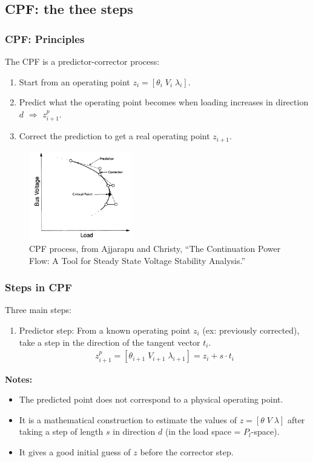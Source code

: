 \documentclass{beamer}
\begin{document}
\subsection{CPF: the thee steps}

\begin{frame}
  \frametitle{CPF: Principles}
The CPF is a predictor-corrector process:
\begin{enumerate}
\item Start from an operating point $z_i = [\theta_i \; V_i \; \lambda_i]$.
\item Predict what the operating point becomes when loading increases in direction $d$ $\Rightarrow$ $z_{i+1}^p$.
\item Correct the prediction to get a real operating point $z_{i+1}$.
\end{enumerate}
\begin{figure}[!h]
  \centering
  \includegraphics[width=0.4\textwidth]{CPFprocess.pdf}
  \caption{CPF process, from Ajjarapu and Christy, “The Continuation Power Flow: A Tool for Steady State Voltage Stability Analysis.”}
  \label{fig:CPFprocess}
\end{figure}
\end{frame}

\begin{frame}
  \frametitle{Steps in CPF}
Three main steps:
\begin{enumerate}
\item Predictor step: From a known operating point $z_i$ (ex: previously corrected), take a step in the direction of the tangent vector $t_{i}$.
  \begin{align}
  z_{i+1}^p = [\theta_{i+1} \; V_{i+1} \; \lambda_{i+1} ]= z_{i} + s \cdot t_{i}  
  \end{align}
\end{enumerate}
\textbf{Notes:}
\begin{itemize}
\item  The predicted point does not correspond to a physical operating point. 
\item It is a mathematical construction to estimate the values of $z=[\theta \; V \; \lambda]$ after taking a step of length $s$ in direction $d$ (in the load space = $P_l$-space).
\item It gives a good initial guess of $z$ before the corrector step.
\end{itemize}
\end{frame}
\end{document}
